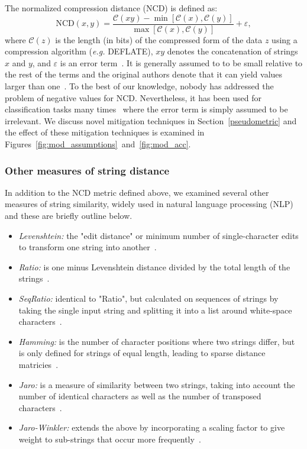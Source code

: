 \documentclass[conference]{IEEEtran}
\begin{document}
The normalized compression distance (NCD) is defined as:
\begin{equation}
    \text{NCD}(x, y) = \frac{\mathcal{C}(xy) - \min[\mathcal{C}(x), \mathcal{C}(y)]}{\max[\mathcal{C}(x), \mathcal{C}(y)]} + \varepsilon,
\end{equation}
where $\mathcal{C}(z)$ is the length (in bits) of the compressed form of the data $z$ using a compression algorithm (\textit{e.g.} DEFLATE), $xy$ denotes the concatenation of strings $x$ and $y$, and $\varepsilon$ is an error term~\cite{ncd}. It is generally assumed to to be small relative to the rest of the terms and the original authors denote that it can yield values larger than one~\cite{ncd}. To the best of our knowledge, nobody has addressed the problem of negative values for NCD\@.
Nevertheless, it has been used for classification tasks many times~\cite{opitz2023gzip,weinreich2023parameter,nishida2011tweet,jiang2022less} where the error term is simply assumed to be irrelevant.
We discuss novel mitigation techniques in Section~\ref{pseudometric} and the effect of these mitigation techniques is examined in Figures~\ref{fig:mod_assumptions}~and~\ref{fig:mod_acc}.


\subsubsection{Other measures of string distance}
\label{string_metrics}

In addition to the NCD metric defined above, we examined several other measures of string similarity, widely used in natural language processing (NLP) and these are briefly outline below. 
\begin{itemize}
    \item \textit{Levenshtein:} the "edit distance" or minimum number of single-character edits to transform one string into another~\cite{navarro2001guided}.
    \item \textit{Ratio:} is one minus Levenshtein distance divided by the total length of the strings~\cite{levenshtein}.
    \item \textit{SeqRatio:} identical to "Ratio", but calculated on sequences of strings by taking the single input string and splitting it into a list around white-space characters~\cite{levenshtein}.
    \item \textit{Hamming:} is the number of character positions where two strings differ, but is only defined for strings of equal length, leading to sparse distance matricies~\cite{hamming_distance}.
    \item \textit{Jaro:} is a measure of similarity between two strings, taking into account the number of identical characters as well as the number of transposed characters~\cite{jaro}.
    \item \textit{Jaro-Winkler:} extends the above by incorporating a scaling factor to give weight to sub-strings that occur more frequently~\cite{jaro}. 
\end{itemize}
\end{document}
